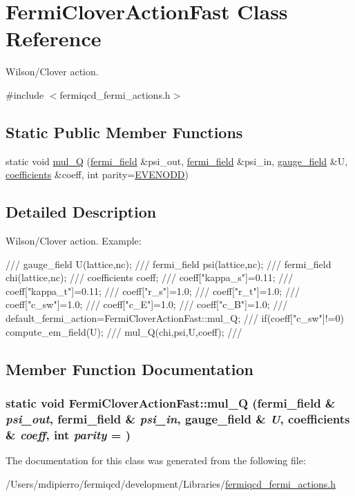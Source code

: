 \hypertarget{class_fermi_clover_action_fast}{
\section{FermiCloverActionFast Class Reference}
\label{class_fermi_clover_action_fast}
}


Wilson/Clover action.  


{\ttfamily \#include $<$fermiqcd\_\-fermi\_\-actions.h$>$}\subsection*{Static Public Member Functions}
\begin{DoxyCompactItemize}
\item 
static void \hyperlink{class_fermi_clover_action_fast_a59f9e2ae136b1b0f490c9157db70c102}{mul\_\-Q} (\hyperlink{classfermi__field}{fermi\_\-field} \&psi\_\-out, \hyperlink{classfermi__field}{fermi\_\-field} \&psi\_\-in, \hyperlink{classgauge__field}{gauge\_\-field} \&U, \hyperlink{classcoefficients}{coefficients} \&coeff, int parity=\hyperlink{mdp__global__vars_8h_a4c9de81f2de5a74b588107b6c0afb9ee}{EVENODD})
\end{DoxyCompactItemize}


\subsection{Detailed Description}
Wilson/Clover action. Example: \begin{DoxyVerb}
/// gauge_field U(lattice,nc);
/// fermi_field psi(lattice,nc);
/// fermi_field chi(lattice,nc);
/// coefficients coeff;
/// coeff["kappa_s"]=0.11;
/// coeff["kappa_t"]=0.11;
/// coeff["r_s"]=1.0;
/// coeff["r_t"]=1.0;
/// coeff["c_{sw}"]=1.0;
/// coeff["c_E"]=1.0;
/// coeff["c_B"]=1.0;
/// default_fermi_action=FermiCloverActionFast::mul_Q;
/// if(coeff["c_{sw}"]!=0) compute_em_field(U);
/// mul_Q(chi,psi,U,coeff);
/// \end{DoxyVerb}
 

\subsection{Member Function Documentation}
\hypertarget{class_fermi_clover_action_fast_a59f9e2ae136b1b0f490c9157db70c102}{
\subsubsection[{mul\_\-Q}]{\setlength{\rightskip}{0pt plus 5cm}static void FermiCloverActionFast::mul\_\-Q ({\bf fermi\_\-field} \& {\em psi\_\-out}, \/  {\bf fermi\_\-field} \& {\em psi\_\-in}, \/  {\bf gauge\_\-field} \& {\em U}, \/  {\bf coefficients} \& {\em coeff}, \/  int {\em parity} = {})}}
\label{class_fermi_clover_action_fast_a59f9e2ae136b1b0f490c9157db70c102}


The documentation for this class was generated from the following file:\begin{DoxyCompactItemize}
\item 
/Users/mdipierro/fermiqcd/development/Libraries/\hyperlink{fermiqcd__fermi__actions_8h}{fermiqcd\_\-fermi\_\-actions.h}\end{DoxyCompactItemize}
